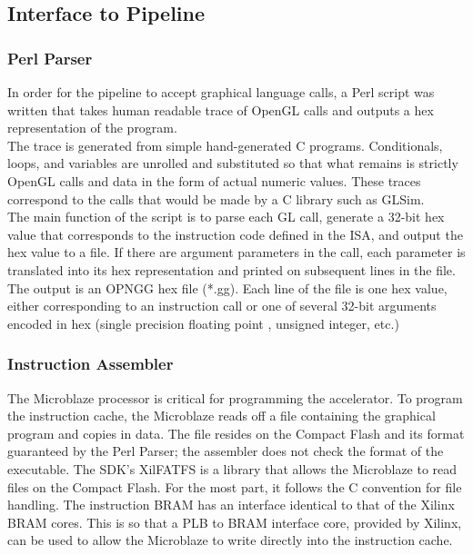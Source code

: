 \documentclass[letterpaper,10pt]{article}
\begin{document}
\subsection{Interface to Pipeline}

\subsubsection{Perl Parser}
In order for the pipeline to accept graphical language calls, a Perl script was written that takes human readable trace of OpenGL calls and outputs a hex representation of the program. \\

The trace is generated from simple hand-generated C programs. Conditionals, loops, and variables are unrolled and substituted so that what remains is strictly OpenGL calls and data in the form of actual numeric values. These traces correspond to the calls that would be made by a C library such as GLSim.\\

The main function of the script is to parse each GL call, generate a 32-bit hex value that corresponds to the instruction code defined in the ISA, and output the hex value to a file. If there are argument parameters in the call, each parameter is translated into its hex representation and printed on subsequent lines in the file. The output is an OPNGG hex file (*.gg). Each line of the file is one hex value, either corresponding to an instruction call or one of several 32-bit arguments encoded in hex (single precision floating point , unsigned integer, etc.)

\subsubsection{Instruction Assembler}
The Microblaze processor is critical for programming the accelerator.  To program the instruction cache, the Microblaze reads off a file containing the graphical program and copies in data.  The file resides on the Compact Flash and its format guaranteed by the Perl Parser; the assembler does not check the format of the executable.  The SDK's XilFATFS is a library that allows the Microblaze to read files on the Compact Flash.  For the most part, it follows the C convention for file handling.  The instruction BRAM has an interface identical to that of the Xilinx BRAM cores.  This is so that a PLB to BRAM interface core, provided by Xilinx, can be used to allow the Microblaze to write directly into the instruction cache.  
\end{document}
